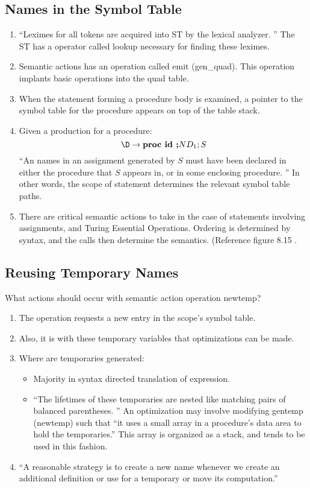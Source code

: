 
\subsection {Names in the Symbol Table}

\begin{enumerate}
\item ``Leximes for all tokens are acquired into ST by the lexical analyzer. ''  \cite{ullmanCompillers} The ST has a operator called lookup necessary for finding these leximes.
\item Semantic actions has an operation called emit (gen\_quad).  This operation implants basic operations into the quad table.  
\item When the statement forming a procedure body is examined, a pointer to the symbol table for the procedure appears on top of the table stack.  
\item Given a production for a procedure:
\[ \D \to \textbf {proc id ;} N D_1 ; S \]
``An names in an assignment generated by $S$ must have been declared in either the procedure that $S$ appears in, or in some enclosing procedure.  ''   \cite{ullmanCompillers}  In other words, the scope of statement determines the relevant symbol table paths.  
\item There are critical semantic actions to take in the case of statements involving  assignments, and Turing Essential Operations.    Ordering is determined by syntax, and the calls then determine the semantics.    (Reference figure 8.15 \cite {ullmanCompilers}.
\end{enumerate}

\subsection {Reusing Temporary Names}
What actions should occur with semantic action operation newtemp?  
\begin{enumerate}
\item The operation requests a new entry in the scope's symbol table.    
\item Also, it is with these temporary variables that optimizations can be made.  
\item Where are temporaries generated:
\begin{itemize}
\item Majority in syntax directed translation of expression.  
\item ``The lifetimes of these temporaries are nested like matching pairs of balanced parentheses.  ''    An optimization may involve modifying gentemp (newtemp) such that ``it uses a small array in a procedure's data area to hold the temporaries.''   This array is organized as a stack, and tends to be used in this fashion.  
\end{itemize}
\item ``A reasonable strategy is to create a new name whenever we create an additional definition or use for a temporary or move its computation.''   
\end{enumerate}



